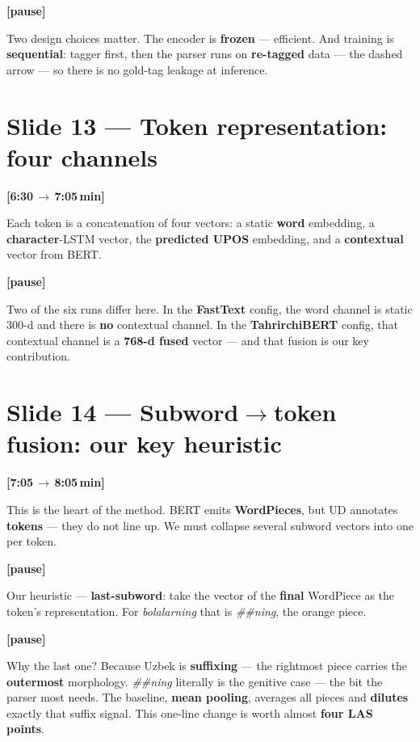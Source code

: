 \documentclass[12pt,a4paper]{article}
\newcommand{\timing}[2]{%
   \par\noindent\textbf{\small [#1\,$\to$\,#2\,min]}\par\vspace{0.2em}}
\newcommand{\say}[1]{\textbf{#1}}
\newcommand{\pause}{\par\vspace{0.4em}\textbf{[pause]}\par}
\begin{document}
\pause

Two design choices matter. The encoder is \say{frozen} --- efficient.
And training is \say{sequential}: tagger first, then the parser runs on
\say{re-tagged} data --- the dashed arrow --- so there is no gold-tag
leakage at inference.

\section*{Slide 13 --- Token representation: four channels}
\timing{6:30}{7:05}

Each token is a concatenation of four vectors: a static \textbf{word}
embedding, a \textbf{character}-LSTM vector, the \textbf{predicted UPOS}
embedding, and a \textbf{contextual} vector from BERT.

\pause

Two of the six runs differ here. In the \say{FastText} config, the word
channel is static 300-d and there is \say{no} contextual channel. In the
\say{TahrirchiBERT} config, that contextual channel is a \textbf{768-d
fused} vector --- and that fusion is our key contribution.

\section*{Slide 14 --- Subword$\to$token fusion: our key heuristic}
\timing{7:05}{8:05}

This is the heart of the method. BERT emits \say{WordPieces}, but UD
annotates \say{tokens} --- they do not line up. We must collapse several
subword vectors into one per token.

\pause

Our heuristic --- \say{last-subword}: take the vector of the \textbf{final}
WordPiece as the token's representation. For \textit{bolalarning} that is
\textit{\#\#ning}, the orange piece.

\pause

Why the last one? Because Uzbek is \say{suffixing} --- the rightmost
piece carries the \say{outermost} morphology. \textit{\#\#ning} literally
is the genitive case --- the bit the parser most needs. The baseline,
\textbf{mean pooling}, averages all pieces and \say{dilutes} exactly that
suffix signal. This one-line change is worth almost \textbf{four LAS
points}.
\end{document}
